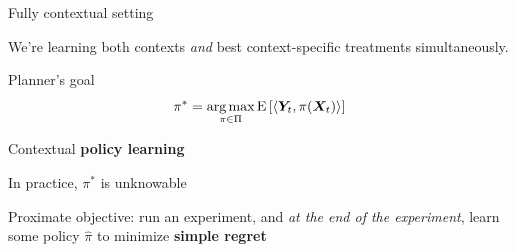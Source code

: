 \documentclass[xcolor={table}]{beamer}
\begin{document}
\begin{frame}{Fully contextual setting}

\begin{wideitemize}
\item We're learning both contexts \textit{and} best context-specific treatments simultaneously. 
\end{wideitemize}

\end{frame}


\note{
\scriptsize \singlespacing

}
\begin{frame}{Planner's goal}
\begin{equation*}
\pi^* = \operatorname*{\textrm{arg}\,\textrm{max}}_{\pi \in \Pi} {\textrm E}\,[\langle \bm{Y}_t,\pi(\bm{X}_t) \rangle]
\label{eq:policy}
\end{equation*}
\pause


\begin{wideitemize}
\item{} Contextual \textbf{policy learning} \citep{kitagawa2018should,athey2021policy}
\item{} In practice, $\pi^*$ is unknowable
\item{} Proximate objective: run an experiment, and \textit{at the end of the experiment}, learn some policy $\hat \pi$ to minimize \textbf{simple regret} %
\end{wideitemize}
%


\end{frame}
\end{document}
